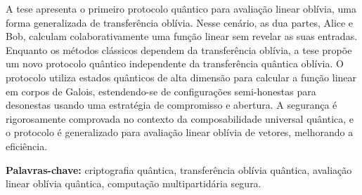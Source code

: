 \documentclass[12pt]{report}
\begin{document}
A tese apresenta o primeiro protocolo quântico para avaliação linear oblívia, uma forma generalizada de transferência oblívia. Nesse cenário, as dua partes, Alice e Bob, calculam colaborativamente uma função linear sem revelar as suas entradas. Enquanto os métodos clássicos dependem da transferência oblívia, a tese propõe um novo protocolo quântico independente da transferência quântica oblívia. O protocolo utiliza estados quânticos de alta dimensão para calcular a função linear em corpos de Galois, estendendo-se de configurações semi-honestas para desonestas usando uma estratégia de compromisso e abertura. A segurança é rigorosamente comprovada no contexto da composabilidade universal quântica, e o protocolo é generalizado para avaliação linear oblívia de vetores, melhorando a eficiência.

\vfill
\begin{flushleft}
\textbf{Palavras-chave:} criptografia qu\^{a}ntica, transferência oblívia quântica, avaliação linear oblívia quântica, computação multipartidária segura.
\end{flushleft}
\end{document}
